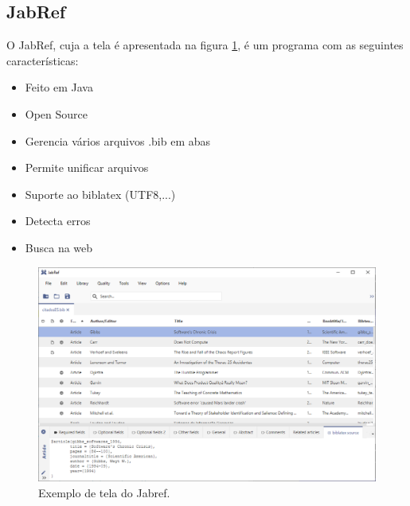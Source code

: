 \subsection{JabRef}
O JabRef, cuja a tela é apresentada na figura \ref{fig:jabref},  é um programa com as seguintes características:
\begin{itemize}
    \item Feito em Java
    \item Open Source
    \item Gerencia vários arquivos .bib em abas
    \item Permite unificar arquivos
    \item Suporte ao biblatex (UTF8,...)
    \item Detecta erros
    \item Busca na web
\end{itemize}


\begin{figure}[hbt]
    \centering
    \includegraphics[width=0.7\linewidth]{Images/jabref}
    \caption{Exemplo de tela do Jabref.}
    \label{fig:jabref}
\end{figure}  







